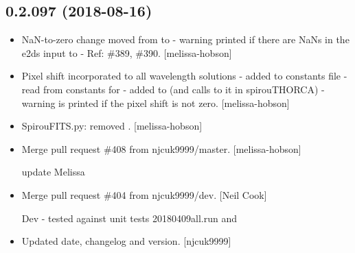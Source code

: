 \documentclass[a4paper,10pt,english]{report}
\begin{document}
\subsection{0.2.097 (2018-08-16)}
\label{\detokenize{misc/changelog:id367}}\begin{itemize}
\item {} 
NaN-to-zero change moved from  to  - warning
printed if there are NaNs in the e2ds input to  - Ref: \#389,
\#390. {[}melissa-hobson{]}

\item {} 
Pixel shift incorporated to all wavelength solutions - added to
constants file - read from constants for  -
added to  (and calls to it in
spirouTHORCA) - warning is printed if the pixel shift is not zero.
{[}melissa-hobson{]}

\item {} 
SpirouFITS.py: removed . {[}melissa-hobson{]}

\item {} 
Merge pull request \#408 from njcuk9999/master. {[}melissa-hobson{]}

update Melissa

\item {} 
Merge pull request \#404 from njcuk9999/dev. {[}Neil Cook{]}

Dev - tested against unit tests 20180409all.run and 

\item {} 
Updated date, changelog and version. {[}njcuk9999{]}

\end{itemize}
\end{document}
